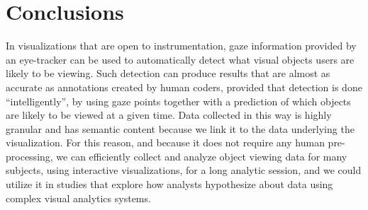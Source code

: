 
\section{Conclusions}
\label{sec:DOICollectionConclusion}
In visualizations that are open to instrumentation, gaze information provided by an eye-tracker can be used to automatically detect what visual objects users are likely to be viewing. Such detection can produce results that are almost as accurate as annotations created by human coders, provided that detection is done ``intelligently'', by using gaze points together with a prediction of which objects are likely to be viewed at a given time. Data collected in this way is highly granular and has semantic content because we link it to the data underlying the visualization. For this reason, and because it does not require any human pre-processing, we can efficiently collect and analyze object viewing data for many subjects, using interactive visualizations, for a long analytic session, and we could utilize it in studies that explore how analysts hypothesize about data using complex visual analytics systems. 
